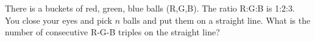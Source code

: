   There is a buckets of red, green, blue
  balls (R,G,B).
  The ratio R:G:B is 1:2:3.
  You close your eyes and pick
  $n$ balls and put them on a straight line.
  What is the number of
  consecutive R-G-B triples
  on the straight line?
